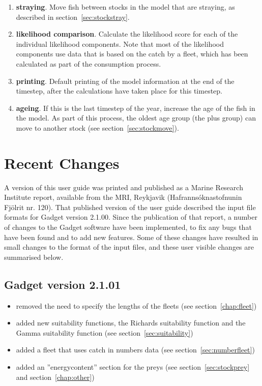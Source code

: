 \documentclass[10pt,twoside]{book}
\begin{document}
\begin{enumerate}
\item {\bf straying}.  Move fish between stocks in the model that are straying, as described in section~\ref{sec:stockstray}.
\item {\bf likelihood comparison}.  Calculate the likelihood score for each of the individual likelihood components.  Note that most of the likelihood components use data that is based on the catch by a fleet, which has been calculated as part of the consumption process.
\item {\bf printing}.  Default printing of the model information at the end of the timestep, after the calculations have taken place for this timestep.
\item {\bf ageing}.  If this is the last timestep of the year, increase the age of the fish in the model.  As part of this process, the oldest age group (the plus group) can move to another stock (see section~\ref{sec:stockmove}).
\end{enumerate}

\chapter{Recent Changes}\label{chap:change}
A version of this user guide was printed and published as a Marine Research Institute report, available from the MRI, Reykjavik (Hafranns\'{o}knastofnunin Fj\"{o}lrit nr. 120).  That published version of the user guide described the input file formats for Gadget version 2.1.00.  Since the publication of that report, a number of changes to the Gadget software have been implemented, to fix any bugs that have been found and to add new features.  Some of these changes have resulted in small changes to the format of the input files, and these user visible changes are summarised below.

\section{Gadget version 2.1.01}\label{sec:v2101}
\begin{itemize}
\item removed the need to specify the lengths of the fleets (see section~\ref{chap:fleet})
\item added new suitability functions, the Richards suitability function and the Gamma suitability function (see section~\ref{sec:suitability})
\item added a fleet that uses catch in numbers data (see section~\ref{sec:numberfleet})
\item added an ''energycontent'' section for the preys (see section~\ref{sec:stockprey} and section~\ref{chap:other})
\end{itemize}
\end{document}
